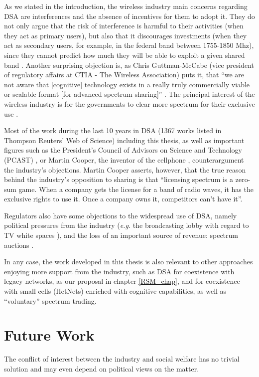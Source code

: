 As we stated in the introduction, the wireless industry main concerns regarding DSA are interferences and the absence of incentives for them to adopt it. They do not only argue that the risk of interference is harmful to their activities (when they act as primary users), but also that it discourages investments (when they act as secondary users, for example, in the federal band between 1755-1850 Mhz), since they cannot predict how much they will be able to exploit a given shared band \cite{CTIA2011}.  Another surprising objection is, as Chris Guttman-McCabe (vice president of regulatory affairs at CTIA - The Wireless Association) puts it, that \enquote{we are not aware that [cognitive] technology exists in a really truly commercially viable or scalable format [for advanced spectrum sharing]} \cite{Chen2012}. The principal interest of the wireless industry is for the governments to clear more spectrum for their exclusive use \cite{Roche2015,Chen2012}. 

Most of the work during the last 10 years in DSA (1367 works listed in Thompson Reuters' Web of Science) including this thesis, as well as important figures such as the President's Council of Advisors on Science and Technology (PCAST) \cite{AdvisorsonScience}, or Martin Cooper, the inventor of the cellphone \cite{Chen2012b,Br2012}, counterargument the industry's objections. Martin Cooper asserts, however, that the true reason behind the industry's opposition to sharing is that \enquote{licensing spectrum is a zero-sum game. When a company gets the license for a band of radio waves, it has the exclusive rights to use it. Once a company owns it, competitors can't have it}.

Regulators also have some objections to the widespread use of DSA, namely political pressures from the industry (\textit{e.g.} the broadcasting lobby with regard to TV white spaces \cite[p. 103]{Nuechterlein2013}), and the loss of an important source of revenue: spectrum auctions \cite{Baker2015}.

In any case, the work developed in this thesis is also relevant to other  approaches enjoying more support from the industry, such as DSA for coexistence with legacy networks, as our proposal in chapter \ref{RSM_chap}, and for coexistence with small cells (HetNets) enriched with cognitive capabilities, as well as \enquote{voluntary} spectrum trading. 

\section{Future Work}
The conflict of interest between the industry and social welfare has no trivial solution and may even depend on political views on the matter. 

